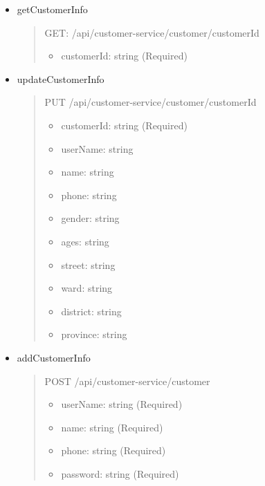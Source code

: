 \begin{itemize}
	\item getCustomerInfo
	      \begin{quote}
		      GET: /api/customer-service/customer/{customerId}
		      \begin{itemize}
			      \item customerId: string (Required)
		      \end{itemize}
	      \end{quote}

	\item updateCustomerInfo
	      \begin{quote}
		      PUT /api/customer-service/customer/{customerId}
		      \begin{itemize}
			      \item customerId: string (Required)
			      \item userName: string
			      \item name: string
			      \item phone: string
			      \item gender: string
			      \item ages: string
			      \item street: string
			      \item ward: string
			      \item district: string
			      \item province: string
		      \end{itemize}
	      \end{quote}

	\item addCustomerInfo
	      \begin{quote}
		      POST /api/customer-service/customer
		      \begin{itemize}
			      \item userName: string (Required)
			      \item name: string (Required)
			      \item phone: string (Required)
			      \item password: string (Required)
		      \end{itemize}
	      \end{quote}
\end{itemize}

